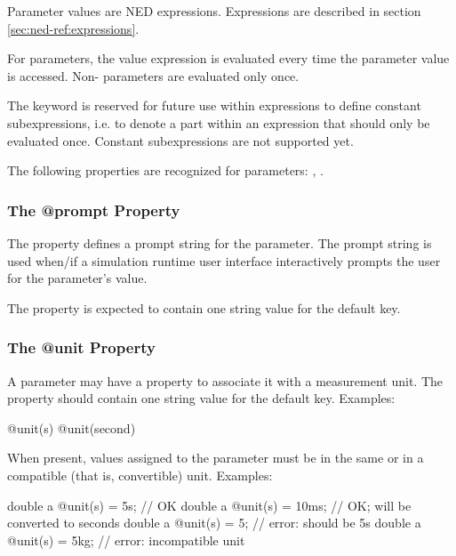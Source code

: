 Parameter values are NED expressions. Expressions are described in section
\ref{sec:ned-ref:expressions}.

For  parameters, the value expression is evaluated every
time the parameter value is accessed. Non- parameters
are evaluated only once.

\begin{note}
    The  keyword is reserved for future use within expressions
    to define constant subexpressions, i.e. to denote a part within
    an expression that should only be evaluated once. Constant subexpressions
    are not supported yet.
\end{note}

The following properties are recognized for parameters: ,
.


\subsubsection{The @prompt Property}
\label{sec:ned-ref:prompt-property}

The  property defines a prompt string for the parameter. The
prompt string is used when/if a simulation runtime user interface
interactively prompts the user for the parameter's value.

The  property is expected to contain one string value for the
default key.


\subsubsection{The @unit Property}
\label{sec:ned-ref:unit-property}

A parameter may have a  property to associate it with a measurement
unit. The  property should contain one string value for the default
key. Examples:

\begin{ned}
@unit(s)
@unit(second)
\end{ned}

When present, values assigned to the parameter must be in the
same or in a compatible (that is, convertible) unit.
Examples:

\begin{ned}
  double a @unit(s) = 5s;   // OK
  double a @unit(s) = 10ms; // OK; will be converted to seconds
  double a @unit(s) = 5;    // error: should be 5s
  double a @unit(s) = 5kg;  // error: incompatible unit
\end{ned}

